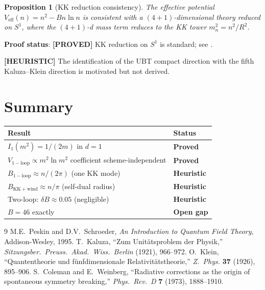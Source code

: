 \documentclass[11pt,a4paper]{article}
\newtheorem{proposition}{Proposition}
\newcommand{\proved}[1]{\textbf{[PROVED]} #1}
\newcommand{\heuristic}[1]{\textbf{[HEURISTIC]} #1}
\begin{document}
\begin{proposition}[KK reduction consistency]
  The effective potential $V_\mathrm{eff}(n) = n^2 - Bn\ln n$ is consistent
  with a $(4+1)$-dimensional theory reduced on $S^1$, where the $(4+1)$-d
  mass term reduces to the KK tower $m_n^2 = n^2/R^2$.
\end{proposition}

\textbf{Proof status}: \proved{KK reduction on $S^1$ is standard; see
\cite{Kaluza1921,Klein1926}.}

\heuristic{The identification of the UBT compact direction with the fifth
Kaluza--Klein direction is motivated but not derived.}

\section{Summary}

\begin{center}
\begin{tabular}{ll}
\hline
Result & Status \\
\hline
$I_1(m^2) = 1/(2m)$ in $d=1$ & \textbf{Proved} \\
$V_\mathrm{1-loop} \propto m^2\ln m^2$ coefficient scheme-independent & \textbf{Proved} \\
$B_\mathrm{1-loop} \approx n/(2\pi)$ (one KK mode) & \textbf{Heuristic} \\
$B_\mathrm{KK+wind} \approx n/\pi$ (self-dual radius) & \textbf{Heuristic} \\
Two-loop: $\delta B \approx 0.05$ (negligible) & \textbf{Heuristic} \\
$B = 46$ exactly & \textbf{Open gap} \\
\hline
\end{tabular}
\end{center}

\begin{thebibliography}{9}
 M.E.\ Peskin and D.V.\ Schroeder, \emph{An Introduction to
  Quantum Field Theory}, Addison-Wesley, 1995.
 T.\ Kaluza, ``Zum Unit\"atsproblem der Physik,''
  \emph{Sitzungsber.\ Preuss.\ Akad.\ Wiss.\ Berlin} (1921), 966--972.
 O.\ Klein, ``Quantentheorie und f\"unfdimensionale
  Relativit\"atstheorie,'' \emph{Z.\ Phys.} \textbf{37} (1926), 895--906.
 S.\ Coleman and E.\ Weinberg, ``Radiative corrections as the
  origin of spontaneous symmetry breaking,'' \emph{Phys.\ Rev.\ D} \textbf{7}
  (1973), 1888--1910.
\end{thebibliography}
\end{document}
